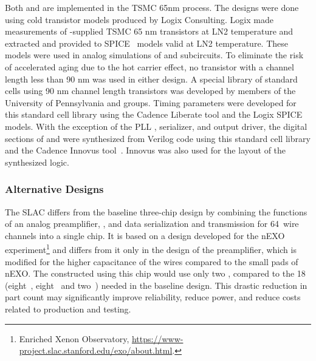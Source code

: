 Both  and  are implemented in the TSMC 65nm  process.\cite{TSMC65} The designs were done using cold transistor models produced by Logix Consulting.\cite{Logix} Logix made measurements of -supplied TSMC 65 nm transistors at LN2 temperature and extracted and provided to  SPICE~\cite{spice} models valid at LN2 temperature.  These models were used in analog simulations of  and  subcircuits.  To eliminate the risk of accelerated aging due to the hot carrier effect,\cite{Hot-electron} no transistor with a channel length less than 90 nm was used in either  design.  A special library of standard cells using 90 nm channel length transistors was developed by members of the University of Pennsylvania and  groups.  Timing parameters were developed for this standard cell library using the Cadence Liberate tool\cite{Liberate} and the Logix SPICE models.  With the exception of the  PLL , serializer, and output driver, the digital sections of  and  were synthesized from Verilog code using this standard cell library and the Cadence Innovus tool~\cite{Innovus}. Innovus was also used for the layout of the synthesized logic.


\subsubsection{Alternative Designs}
\label{sec:fdsp-tpcelec-design-femb-alt}


\label{sec:fdsp-tpcelec-design-femb-alt-cryo}

The SLAC    differs from the baseline three-chip design by combining the functions of an analog preamplifier, , and data serialization and transmission for \num{64}~wire channels into a single chip.
It is based on a design developed for the nEXO experiment\footnote{Enriched Xenon Observatory, \url{https://www-project.slac.stanford.edu/exo/about.html}.} and differs from it only in the design of the preamplifier, which is modified for the higher capacitance of the   wires compared to the small pads of nEXO.
The  constructed using this chip would use only two , compared to the \num{18} (eight~, eight~ and two~) needed in the baseline design.
This drastic reduction in part count may significantly improve  reliability, reduce power, and reduce costs related to production and testing. 

